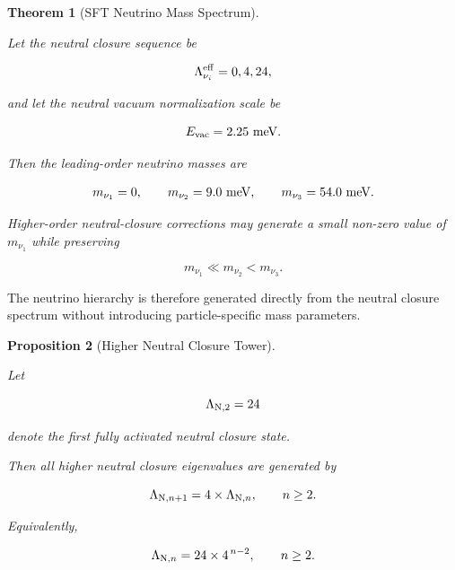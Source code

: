 \documentclass[11pt]{article}
\newtheorem{theorem}{Theorem}[section]
\newtheorem{proposition}[theorem]{Proposition}
\theoremstyle{definition}
\theoremstyle{remark}
\begin{document}
\begin{theorem}[SFT Neutrino Mass Spectrum]
\label{thm:sft_neutrino_spectrum}

Let the neutral closure sequence be

\begin{equation}
\Lambda_{\nu_i}^{\rm eff} =
{0,4,24},
\end{equation}

and let the neutral vacuum normalization scale be

\begin{equation}
E_{\rm vac} =
2.25~{\rm meV}.
\end{equation}

Then the leading-order neutrino masses are

\begin{equation}
m_{\nu_1}=0,
\qquad
m_{\nu_2}=9.0~{\rm meV},
\qquad
m_{\nu_3}=54.0~{\rm meV}.
\end{equation}

Higher-order neutral-closure corrections may generate a small
non-zero value of \(m_{\nu_1}\) while preserving

\begin{equation}
m_{\nu_1}
\ll
m_{\nu_2}
<
m_{\nu_3}.
\end{equation}

\end{theorem}

The neutrino hierarchy is therefore generated directly from the
neutral closure spectrum without introducing particle-specific
mass parameters.



\begin{proposition}[Higher Neutral Closure Tower]
\label{prop:higher_neutral_tower}

Let

\begin{equation}
\Lambda_{{\rm N},2}
=
24
\end{equation}

denote the first fully activated neutral closure state.

Then all higher neutral closure eigenvalues are generated by

\begin{equation}
\Lambda_{{\rm N},n+1}
=
4\times
\Lambda_{{\rm N},n},
\qquad
n\geq2.
\label{eq:higher_neutral_recursion}
\end{equation}

Equivalently,

\begin{equation}
\Lambda_{{\rm N},n}
=
24\times4^{\,n-2},
\qquad
n\geq2.
\label{eq:neutral_tower}
\end{equation}

\end{proposition}
\end{document}
